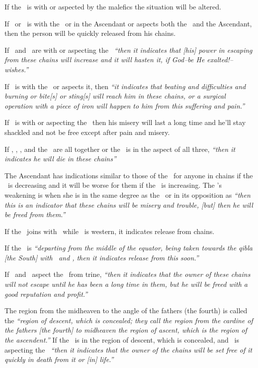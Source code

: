 If the \Moon\, is with or aspected by the malefics the situation will be altered.

If \Jupiter\, or \Venus\, is with the \Moon\, or in the Ascendant or aspects both the \Moon\, and the Ascendant, then the person will be quickly released from his chains.

If \Mercury\, and \Jupiter\, are with or aspecting the \Moon\,  \textsl{``then it indicates that [his] power in escaping from these chains will increase and it will hasten it, if God--be He exalted!--wishes.''}

If \Mars\, is with the \Moon\, or aspects it, then \textsl{``it indicates that beating and difficulties and burning or bite[s] or sting[s] will reach him in these chains, or a surgical operation with a piece of iron will happen to him from this suffering and pain.''}

If \Saturn\, is with or aspecting the \Moon\ then his misery will last a long time and he'll stay shackled and not be free except after pain and misery.

If \Mercury, \Saturn, \Mars, and the \Moon\, are all together or the \Moon\, is in the aspect of all three, \textsl{``then it indicates he will die in these chains''}

The Ascendant has indications similar to those of the \Moon\, for anyone in chains if the \Moon\, is decreasing and it will be worse for them if the \Moon\, is increasing. The \Moon's weakening is when she is in the same degree as the \Sun\, or in its opposition as \textsl{``then this is an indicator that these chains will be misery and trouble, [but] then he will be freed from them.''}

If the \Moon\, joins with \Mercury\, while \Mercury\, is western, it indicates release from chains. 

If the \Moon\, is \textsl{``departing from the middle of the equator, being taken towards the qibla [the South] with \Mercury\, and \Venus, then it indicates release from this soon.''}

If \Saturn\, and \Jupiter\, aspect the \Moon\, from trine, \textsl{``then it indicates that the owner of these chains will not escape until he has been a long time in them, but he will be freed with a good reputation and profit.''}

The region from the midheaven to the angle of the fathers (the fourth) is called the \textsl{``region of descent, which is concealed; they call the region from the cardine of the fathers [the fourth] to midheaven the region of ascent, which is the region of the ascendent.''} If the \Moon\, is in the region of descent, which is concealed, and \Mars\, is aspecting the \Moon\, \textsl{``then it indicates that the owner of the chains will be set free of it quickly in death from it or [in] life.''}

